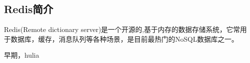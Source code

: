 
\subsection{Redis简介}
Redis(Remote dictionary server)是一个开源的,基于内存的数据存储系统，它常用于数据库，缓存，消息队列等各种场景，是目前最热门的NoSQL数据库之一。

早期，hulia


